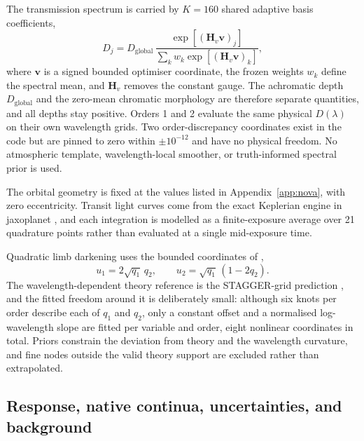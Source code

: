 The transmission spectrum is carried by $K=160$ shared adaptive basis
coefficients,
\begin{equation}
  D_j = D_{\mathrm{global}}\,
  \frac{\exp\!\left[(\bm{H}_v\bm{v})_j\right]}
       {\sum_k w_k \exp\!\left[(\bm{H}_v\bm{v})_k\right]} ,
  \label{eq:depth-basis}
\end{equation}
where $\bm{v}$ is a signed bounded optimiser coordinate, the frozen weights
$w_k$ define the spectral mean, and $\bm{H}_v$ removes the constant gauge.
The achromatic depth $D_{\mathrm{global}}$ and the zero-mean chromatic
morphology are therefore separate quantities, and all depths stay positive.
Orders 1 and 2 evaluate the same physical $D(\lambda)$ on their own
wavelength grids. Two order-discrepancy coordinates exist in the code but
are pinned to zero within $\pm 10^{-12}$ and have no physical freedom. No
atmospheric template, wavelength-local smoother, or truth-informed spectral
prior is used.

The orbital geometry is fixed at the values listed in
Appendix~\ref{app:nova}, with zero eccentricity. Transit light curves come
from the exact Keplerian engine in jaxoplanet \citep{Jaxoplanet2025}, and
each integration is modelled as a finite-exposure average over 21
quadrature points rather than evaluated at a single mid-exposure time.

Quadratic limb darkening \citep{MandelAgol2002} uses the bounded
coordinates of \citet{Kipping2013},
\begin{equation}
 u_1=2\sqrt{q_1}\,q_2, \qquad
 u_2=\sqrt{q_1}\,(1-2q_2).
 \label{eq:kipping-coordinates}
\end{equation}
The wavelength-dependent theory reference is the STAGGER-grid prediction
\citep{MagicEtAl2015}, and the fitted freedom around it is deliberately
small: although six knots per order describe each of $q_1$ and $q_2$, only
a constant offset and a normalised log-wavelength slope are fitted per
variable and order, eight nonlinear coordinates in total. Priors constrain
the deviation from theory and the wavelength curvature, and fine nodes
outside the valid theory support are excluded rather than extrapolated.

\subsection{Response, native continua, uncertainties, and background}


